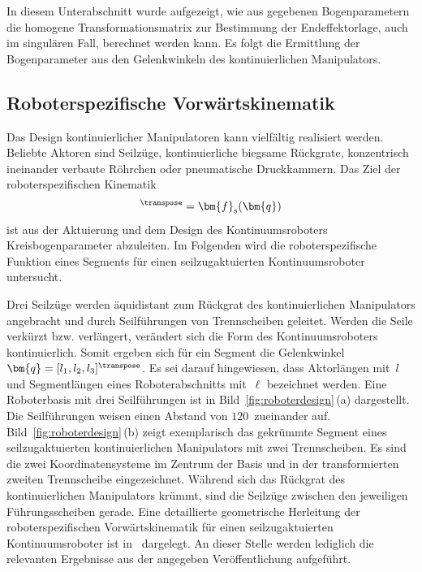 In diesem Unterabschnitt wurde aufgezeigt, wie aus gegebenen Bogenparametern die homogene Transformationsmatrix zur Bestimmung der Endeffektorlage, auch im singulären Fall, berechnet werden kann. Es folgt die Ermittlung der Bogenparameter aus den Gelenkwinkeln des kontinuierlichen Manipulators.






\subsection{Roboterspezifische Vorwärtskinematik}
\label{subsec:spezifische_vorwaertskinematik}

Das Design kontinuierlicher Manipulatoren kann vielfältig realisiert werden. Beliebte Aktoren sind Seilzüge, kontinuierliche biegsame Rückgrate, konzentrisch ineinander verbaute Röhrchen oder pneumatische Druckkammern. Das Ziel der roboterspezifischen Kinematik
\begin{align}
[\kappa, \phi, \ell]^\transpose = \bm{f}_{\mathrm{s}}(\bm{q})
\label{eq:fspezifisch}
\end{align}
ist aus der Aktuierung und dem Design des Kontinuumsroboters Kreisbogenparameter abzuleiten. Im Folgenden wird die roboterspezifische Funktion eines Segments für einen seilzugaktuierten Kontinuumsroboter untersucht. \newline

Drei Seilzüge werden äquidistant zum Rückgrat des kontinuierlichen Manipulators angebracht und durch Seilführungen von Trennscheiben geleitet. Werden die Seile verkürzt bzw. verlängert, verändert sich die Form des Kontinuumsroboters kontinuierlich. Somit ergeben sich für ein Segment die Gelenkwinkel~$\bm{q} = [l_1, l_2, l_3]^\transpose$. Es sei darauf hingewiesen, dass Aktorlängen mit~$l$ und Segmentlängen eines Roboterabschnitts mit~$\ell$ bezeichnet werden. Eine Roboterbasis mit drei Seilführungen ist in Bild~\ref{fig:roboterdesign}\,(a) dargestellt. Die Seilführungen weisen einen Abstand von $120$\degree~zueinander auf. 
Bild~\ref{fig:roboterdesign}\,(b) zeigt exemplarisch das gekrümmte Segment eines seilzugaktuierten kontinuierlichen Manipulators mit zwei Trennscheiben. Es sind die zwei Koordinatensysteme im Zentrum der Basis und in der transformierten zweiten Trennscheibe eingezeichnet. Während sich das Rückgrat des kontinuierlichen Manipulators krümmt, sind die Seilzüge zwischen den jeweiligen Führungsscheiben gerade.
Eine detaillierte geometrische Herleitung der roboterspezifischen Vorwärtskinematik für einen seilzugaktuierten Kontinuumsroboter ist in~\cite{JW06} dargelegt. An dieser Stelle werden lediglich die relevanten Ergebnisse aus der angegeben Veröffentlichung aufgeführt. 

